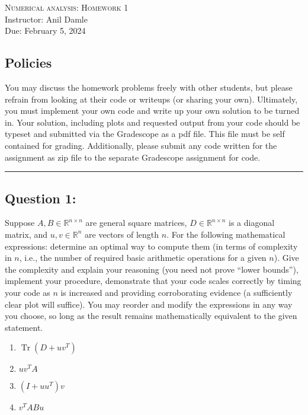 \documentclass[11pt,onecolumn]{article}
\newcommand{\R}{\mathbb{R}}
\DeclareMathOperator{\Tr}{Tr}
\begin{document}
\noindent
\textsc{\Large Numerical analysis: Homework 1}\\
Instructor: Anil Damle\\
Due: February 5, 2024\\

\subsection*{Policies}
You may discuss the homework problems freely with other students, but please
refrain from looking at their code or writeups (or sharing your own).
Ultimately, you must implement your own code and write up your own solution to
be turned in. Your solution, including plots and requested output from your code
should be typeset and submitted via the Gradescope as a pdf file. This file must be self contained for grading. Additionally, please
submit any code written for the assignment as zip
file to the separate Gradescope assignment for code.\\
\hrule
\vspace{1cm}
\noindent

\subsection*{Question 1:}
Suppose $A,B\in \R^{n\times n}$ are general square matrices, $D\in\R^{n\times n}$ is a diagonal matrix, and $u,v\in\R^n$ are vectors of length $n.$ For the following mathematical expressions: determine an optimal way to compute them (in terms of complexity in $n$, i.e., the number of required basic arithmetic operations for a given $n$). Give the complexity and explain your reasoning (you need not prove ``lower bounds''), implement your procedure, demonstrate that your code scales correctly by timing your code as $n$ is increased and providing corroborating evidence (a sufficiently clear plot will suffice). You may reorder and modify the expressions in any way you choose, so long as the result remains mathematically equivalent to the given statement.
\begin{enumerate}[label=(\alph*)]
\item $\Tr(D+uv^T)$
\item $uv^TA$
\item $(I+uu^T)v$
\item $v^TABu$
\end{enumerate}
\end{document}
